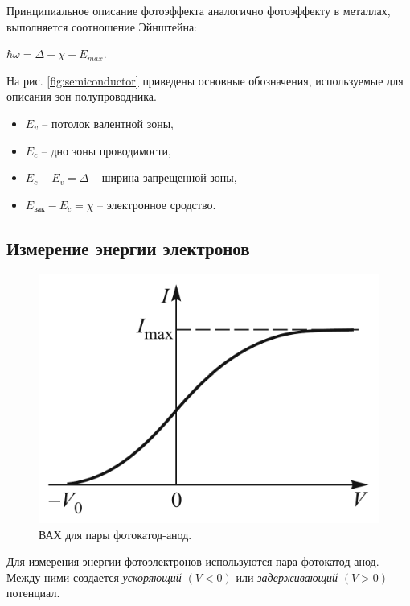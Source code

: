\documentclass[12pt,a4paper]{article}
\begin{document}
	Принципиальное описание фотоэффекта аналогично фотоэффекту в металлах, выполняется соотношение Эйнштейна: 
	
	\begin{center}
		$\hbar \omega = \Delta + \chi + E_{max}$.
	\end{center}
	
	На рис. \ref{fig:semiconductor} приведены основные обозначения, используемые для описания зон полупроводника.
	
	\begin{itemize}[itemsep=0pt]
		\item $E_v$ -- потолок валентной зоны,
		\item $E_c$ -- дно зоны проводимости,
		\item $E_c - E_v = \Delta$ -- ширина запрещенной зоны,
		\item $E_{\text{вак}} - E_c = \chi$ -- электронное сродство.
	\end{itemize}
	
	\newpage
		
	\subsection*{Измерение энергии электронов}
	\begin{figure}
		\includegraphics[scale=0.3]{res/iv_curve.png}
		\caption{ВАХ для пары фотокатод-анод.}
		\label{fig:iv_curve}
		\vspace{-10pt}
	\end{figure}

	Для измерения энергии фотоэлектронов используются пара фотокатод-анод. Между ними создается \textit{ускоряющий} $(V < 0)$ или \textit{задерживающий} $(V > 0)$ потенциал.
	
\end{document}
